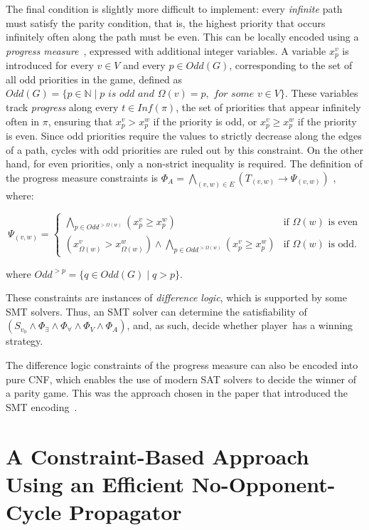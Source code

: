 \documentclass[a4paper,fleqn]{cas-sc}
\begin{document}
The final condition is slightly more difficult to implement: every \textit{infinite} path must satisfy the parity condition, that is, the highest priority that occurs infinitely often along the path must be even. This can be locally encoded using a \textit{progress measure}~\citep{Heljanko:2012,Jurdziński:2000}, expressed with additional integer variables. A variable $x_p^v$ is introduced for every $v \in V$ and every $p \in \textit{Odd}(G)$, corresponding to the set of all odd priorities in the game, defined as $\textit{Odd}(G) = \{ p\in {\mathbb N} \mid p \textit{ is odd and } \Omega(v) = p, \textit{ for some } v \in V \}$. These variables track \textit{progress} along every $ t \in \textit{Inf}(\pi) $, the set of priorities that appear infinitely often in $\pi$, ensuring that $x_p^v > x_p^w$ if the priority is odd, or $x_p^v \geq x_p^w$ if the priority is even. Since odd priorities require the values to strictly decrease along the edges of a path, cycles with odd priorities are ruled out by this constraint. On the other hand, for even priorities, only a non-strict inequality is required.
%
The definition of the progress measure constraints \citep{Heljanko:2012,Cotton:2004} is 
$\Phi_A = \bigwedge_{(v,w) \in E} \left(T_{(v,w)} \rightarrow \Psi_{(v,w)}\right)$ , where:

\[
\Psi_{(v,w)} = 
\begin{cases} 
\bigwedge_{p \in \textit{Odd}^{>\Omega(w)}} (x_p^v \geq x_p^w) & \text{if } \Omega(w) \text{ is even} \\
(x_{\Omega(w)}^v > x_{\Omega(w)}^w) \land \bigwedge_{p \in \textit{Odd}^{>\Omega(w)}} (x_p^v \geq x_p^w) & \text{if } \Omega(w) \text{ is odd}.
\end{cases}
\]

where $\textit{Odd}^{>p} = \{ q \in \textit{Odd}(G) \mid q > p \}$.

These constraints are instances of {\em difference logic}, which is supported by some SMT solvers. Thus, an SMT solver can determine the satisfiability of~$(S_{v_0} \wedge \Phi_{\exists} \wedge \Phi_{\forall} \wedge \Phi_V \wedge \Phi_A)$, and, as such, decide whether player~\even has a winning strategy.

The difference logic constraints of the progress measure can also be encoded into pure CNF, which enables the use of modern SAT solvers to decide the winner of a parity game. This was the approach chosen in the paper that introduced the SMT encoding~\citep{Heljanko:2012}. 

\section{A Constraint-Based Approach Using an Efficient No-Opponent-Cycle Propagator}
\end{document}
